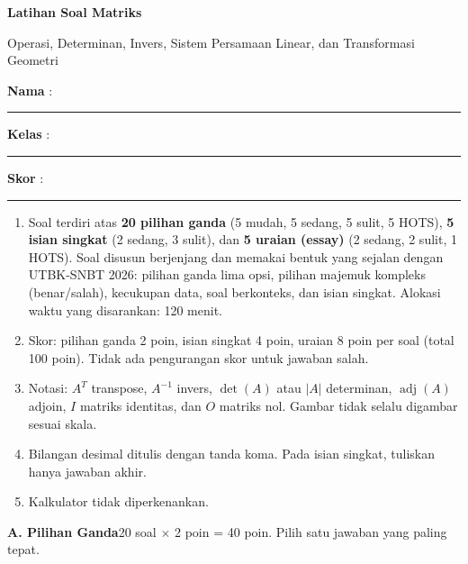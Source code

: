 \documentclass[a4paper,11pt]{article}
\newcommand{\adj}{\operatorname{adj}}
\newcounter{no}
\newcommand{\bagian}[2]{\par\Needspace{6\baselineskip}\vspace{1.0em}\noindent
  \begin{tcolorbox}[colback=mainc,colframe=mainc,coltext=white,boxrule=0pt,arc=2pt,left=6pt,right=6pt,top=3pt,bottom=3pt]
  \textbf{#1}\hfill{\small #2}\end{tcolorbox}\setcounter{no}{0}\par\vspace{-0.3em}}
\begin{document}
\thispagestyle{fancy}

\begin{center}
  {\color{mainc}\fontsize{22}{26}\selectfont\bfseries Latihan Soal Matriks\par}
  \vspace{2pt}
  {\color{accc}\large Operasi, Determinan, Invers, Sistem Persamaan Linear, dan Transformasi Geometri\par}
\end{center}
\vspace{2pt}
\begin{tcolorbox}[colback=softbg,colframe=mainc!40,boxrule=0.6pt,arc=3pt,left=8pt,right=8pt,top=5pt,bottom=5pt]
\noindent\textbf{Nama} : \rule{4.6cm}{0.4pt}\hfill\textbf{Kelas} : \rule{2.2cm}{0.4pt}\hfill\textbf{Skor} : \rule{2.2cm}{0.4pt}
\end{tcolorbox}
\vspace{2pt}
\begin{tcolorbox}[colback=white,colframe=accc,boxrule=0.8pt,arc=3pt,left=8pt,right=8pt,top=4pt,bottom=4pt,title={\bfseries Petunjuk Pengerjaan},coltitle=white,fonttitle=\small]
\small
\begin{enumerate}[leftmargin=1.4em,itemsep=1pt,topsep=1pt]
\item Soal terdiri atas \textbf{20 pilihan ganda} (5 mudah, 5 sedang, 5 sulit, 5 HOTS), \textbf{5 isian singkat} (2 sedang, 3 sulit), dan \textbf{5 uraian (essay)} (2 sedang, 2 sulit, 1 HOTS). Soal disusun berjenjang dan memakai bentuk yang sejalan dengan UTBK-SNBT 2026: pilihan ganda lima opsi, pilihan majemuk kompleks (benar/salah), kecukupan data, soal berkonteks, dan isian singkat. Alokasi waktu yang disarankan: 120 menit.
\item Skor: pilihan ganda 2 poin, isian singkat 4 poin, uraian 8 poin per soal (total 100 poin). Tidak ada pengurangan skor untuk jawaban salah.
\item Notasi: $A^T$ transpose, $A^{-1}$ invers, $\det(A)$ atau $|A|$ determinan, $\adj(A)$ adjoin, $I$ matriks identitas, dan $O$ matriks nol. Gambar tidak selalu digambar sesuai skala.
\item Bilangan desimal ditulis dengan tanda koma. Pada isian singkat, tuliskan hanya jawaban akhir.
\item Kalkulator tidak diperkenankan.
\end{enumerate}
\end{tcolorbox}

\bagian{A. Pilihan Ganda}{20 soal $\times$ 2 poin = 40 poin. Pilih satu jawaban yang paling tepat.}
\end{document}
